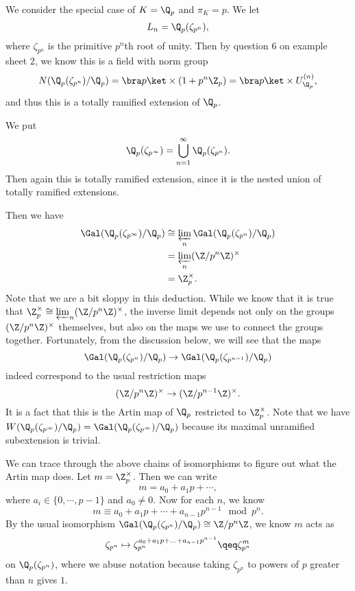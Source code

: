 \documentclass[a4paper]{article}
\begin{document}
\begin{eg}
  We consider the special case of $K = \Q_p$ and $\pi_K = p$. We let
  \[
    L_n = \Q_p (\zeta_{p^n}),
  \]
  where $\zeta_{p^n}$ is the primitive $p^n$th root of unity. Then by question 6 on example sheet 2, we know this is a field with norm group
  \[
    N(\Q_p(\zeta_{p^n})/\Q_p) = \bra p\ket \times(1 + p^n\Z_p) = \bra p \ket \times U_{\Q_p}^{(n)},
  \]
  and thus this is a totally ramified extension of $\Q_p$.

  We put
  \[
    \Q_p(\zeta_{p^\infty}) = \bigcup_{n = 1}^\infty \Q_p(\zeta_{p^n}).
  \]
  Then again this is totally ramified extension, since it is the nested union of totally ramified extensions.

  Then we have
  \begin{align*}
    \Gal(\Q_p(\zeta_{p^\infty})/\Q_p) &\cong \varprojlim_n \Gal(\Q_p(\zeta_{p^n})/\Q_p)\\
    &= \varprojlim_n (\Z/p^n \Z)^\times \\
    &= \Z_p^\times.
  \end{align*}
  Note that we are a bit sloppy in this deduction. While we know that it is true that $\Z_p^\times \cong \varprojlim_n (\Z/p^n\Z)^\times$, the inverse limit depends not only on the groups $(\Z/p^n\Z)^\times$ themselves, but also on the maps we use to connect the groups together. Fortunately, from the discussion below, we will see that the maps
  \[
    \Gal(\Q_p(\zeta_{p^n})/\Q_p) \to \Gal(\Q_p(\zeta_{p^{n - 1}})/\Q_p)
  \]
  indeed correspond to the usual restriction maps
  \[
    (\Z/p^n \Z)^\times \to (\Z/p^{n - 1}\Z)^\times.
  \]
  It is a fact that this is the Artin map of $\Q_p$ restricted to $\Z_p^\times$. Note that we have $W(\Q_p(\zeta_{p^\infty})/\Q_p) = \Gal(\Q_p(\zeta_{p^\infty})/\Q_p)$ because its maximal unramified subextension is trivial.

  We can trace through the above chains of isomorphisms to figure out what the Artin map does. Let $m = \Z_p^\times$. Then we can write
  \[
    m = a_0 + a_1p + \cdots,
  \]
  where $a_i \in \{0, \cdots, p - 1\}$ and $a_0 \not= 0$. Now for each $n$, we know
  \[
    m \equiv a_0 + a_1 p + \cdots + a_{n - 1}p^{n - 1} \mod p^n.
  \]
  By the usual isomorphism $\Gal(\Q_p(\zeta_{p^n})/\Q_p) \cong \Z/p^n\Z$, we know $m$ acts as
  \[
    \zeta_{p^n} \mapsto \zeta_{p^n}^{a_0 + a_1 p + \ldots + a_{n - 1} p^{n - 1}} \qeq \zeta_{p^n}^m
  \]
  on $\Q_p(\zeta_{p^n})$, where we abuse notation because taking $\zeta_{p^n}$ to powers of $p$ greater than $n$ gives $1$.


\end{eg}
\end{document}
